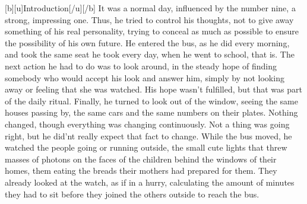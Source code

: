 [b][u]Introduction[/u][/b]
It was a normal day, influenced by the number nine, a strong, impressing one. Thus, he tried to control his thoughts, not to give away something of his real personality, trying to conceal as much as possible to ensure the possibility of his own future. He entered the bus, as he did every morning, and took the same seat he took every day, when he went to school, that is. The next action he had to do was to look around, in the steady hope of finding somebody who would accept his look and answer him, simply by not looking away or feeling that she was watched. His hope wasn't fulfilled, but that was part of the daily ritual. Finally, he turned to look out of the window, seeing the same houses passing by, the same cars and the same numbers on their plates. Nothing changed, though everything was changing continuously. Not a thing was going right, but he did'nt really expect that fact to change. While the bus moved, he watched the people going or running outside, the small cute lights that threw masses of photons on the faces of the children behind the windows of their homes, them eating the breads their mothers had prepared for them. They already looked at the watch, as if in a hurry, calculating the amount of minutes they had to sit before they joined the others outside to reach the bus. 
